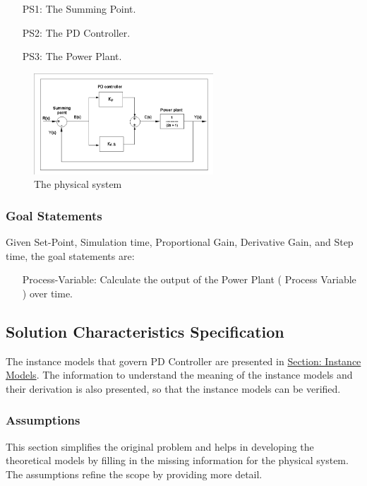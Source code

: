 \documentclass[12pt]{article}
\begin{document}
\begin{itemize}
\item[PS1:]{The Summing Point.}
\item[PS2:]{The PD Controller.}
\item[PS3:]{The Power Plant.}
\end{itemize}
\begin{figure}
\begin{center}
\includegraphics[width=0.6\textwidth]{../../../datafiles/PIDController/Fig_PDController.png}
\caption{The physical system}
\label{Figure:pidSysDiagram}
\end{center}
\end{figure}
\subsubsection{Goal Statements}
\label{Sec:GoalStmt}
Given Set-Point, Simulation time, Proportional Gain, Derivative Gain, and Step time, the goal statements are:

\begin{itemize}
\item[Process-Variable:\phantomsection\label{processVariable}]{Calculate the output of the Power Plant ( Process Variable ) over time.}
\end{itemize}
\subsection{Solution Characteristics Specification}
\label{Sec:SolCharSpec}
The instance models that govern PD Controller are presented in \hyperref[Sec:IMs]{Section: Instance Models}. The information to understand the meaning of the instance models and their derivation is also presented, so that the instance models can be verified.

\subsubsection{Assumptions}
\label{Sec:Assumps}
This section simplifies the original problem and helps in developing the theoretical models by filling in the missing information for the physical system. The assumptions refine the scope by providing more detail.
\end{document}
